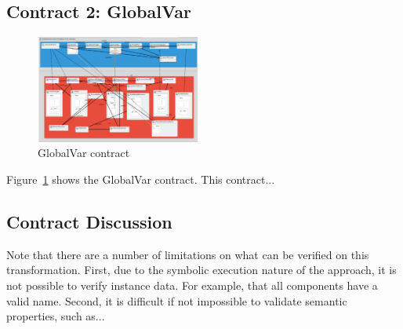 \subsection{Contract 2: GlobalVar}

\begin{figure}
\begin{center}
  \includegraphics[width=0.48\textwidth]{figures/mbeddr/contracts/GlobalVar}
  \caption{GlobalVar contract}
  \label{fig:global_var}
\end{center}
\end{figure}

Figure~\ref{fig:global_var} shows the GlobalVar contract. This contract...

\subsection{Contract Discussion}

Note that there are a number of limitations on what can be verified on this transformation. First, due to the symbolic execution nature of the approach, it is not possible to verify instance data. For example, that all components have a valid name. Second, it is difficult if not impossible to validate semantic properties, such as...




















